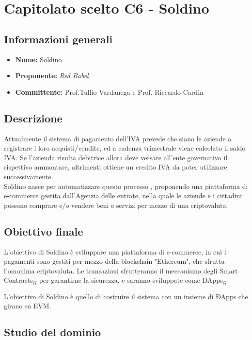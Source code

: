 \section{Capitolato scelto C6 - Soldino}
\subsection{Informazioni generali}
% 
\begin{itemize}
\item
\textbf{Nome:} Soldino
\item
\textbf{Proponente:} \textit{Red Babel} 
\item
\textbf{Committente:} Prof.Tullio Vardanega e Prof. Riccardo Cardin
\end{itemize}
\subsection{Descrizione}
Attualmente il sistema di pagamento dell'IVA prevede che siano le aziende a registrare i loro acquisti/vendite, ed a cadenza trimestrale viene calcolato il saldo IVA. Se l'azienda risulta debitrice allora deve versare all'ente governativo il rispettivo ammontare, altrimenti ottiene un credito IVA da poter utilizzare successivamente. \\Soldino nasce per automatizzare questo processo , proponendo una piattaforma di e-commerce gestita dall'Agenzia delle entrate, nella quale le aziende e i cittadini possono comprare e/o vendere beni e servizi per mezzo di una criptovaluta.

\subsection{Obiettivo finale}

L'obiettivo di Soldino è sviluppare una piattaforma di e-commerce, in cui i pagamenti sono gestiti per mezzo della blockchain "Ethereum", che sfrutta l'omonima criptovaluta. Le transazioni sfrutteranno il meccanismo degli Smart Contracts$_{G}$ per garantirne la sicurezza, e saranno sviluppate come  ÐApps$_{G}$

L'obiettivo di Soldino è quello di costruire il sistema con un insieme di ÐApps 
che girano su EVM.

\subsection{Studio del dominio}
